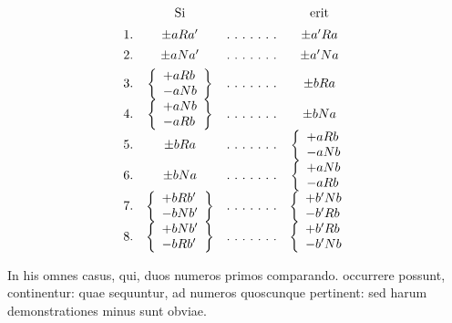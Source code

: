 \[
\begin{array}{rccc}&\text{Si}&&\text{erit}\\[5pt]
1.&\pm aRa'&\mathinner{.\ .\ .\ .\ .\ .\ .}&\pm a' Ra\\[4pt]
2.&\pm aNa'&\mathinner{.\ .\ .\ .\ .\ .\ .}&\pm a' Na\\[4pt]
3.&\left\{\begin{array}{l}+aRb\\-aNb\end{array}\right\}&\mathinner{.\ .\ .\ .\ .\ .\ .}&\pm bRa\\[4pt]
4.&\left\{\begin{array}{l}+aNb\\-aRb\end{array}\right\}&\mathinner{.\ .\ .\ .\ .\ .\ .}&\pm bNa\\[4pt]
5.&\pm bRa&\mathinner{.\ .\ .\ .\ .\ .\ .}&\left\{\begin{array}{l}+aRb\\-aNb\end{array}\right.\\[4pt]
6.&\pm bNa&\mathinner{.\ .\ .\ .\ .\ .\ .}&\left\{\begin{array}{l}+aNb\\-aRb\end{array}\right.\\[4pt]
7.&\left\{\begin{array}{l}+bRb'\\-bNb'\end{array}\right\}&\mathinner{.\ .\ .\ .\ .\ .\ .}&\left\{\begin{array}{l}+b' Nb\\-b' Rb\end{array}\right.\\[4pt]
8.&\left\{\begin{array}{l}+bNb'\\-bRb'\end{array}\right\}&\mathinner{.\ .\ .\ .\ .\ .\ .}&\left\{\begin{array}{l}+b' Rb\\-b' Nb\end{array}\right.\\[4pt]
\end{array}
\]


In his omnes casus, qui, duos numeros primos comparando. occurrere possunt, continentur: quae sequuntur, ad numeros quoscunque pertinent: sed harum demonstrationes minus sunt obviae.

